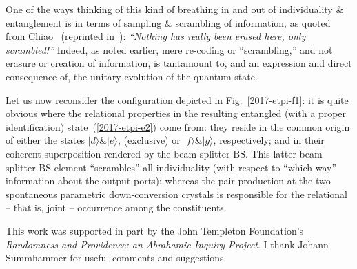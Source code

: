 \documentclass[%
  twocolumn,
 showpacs,
 showkeys,
 preprintnumbers,
 amsmath,amssymb,
 aps,
  pra,
  longbibliography,
 floatfix,
 ]{revtex4-1}
\begin{document}

One of the ways thinking of this kind of  breathing in and out of individuality {\&} entanglement  is in terms of
sampling  {\&} scrambling of information,
as quoted from Chiao~\cite[p.~27]{green-horn-zei} (reprinted in~\cite{Macchiavello-2001}):
{\em ``Nothing has really been erased here, only scrambled!''}
Indeed, as noted earlier, mere re-coding or ``scrambling,''
and not erasure or creation of information, is tantamount to,
and an expression and direct consequence of,
the unitary evolution of the quantum state.


Let us now reconsider the configuration depicted in Fig.~\ref{2017-etpi-f1}: it is quite obvious where the relational properties
in the resulting entangled (with a proper identification)
state~(\ref{2017-etpi-e2}) come from: they reside in the common origin of either the states
$\vert d \rangle${\&}$\vert e \rangle$,
(exclusive) or
$\vert f \rangle${\&}$\vert g \rangle$,
respectively;
and in their coherent superposition rendered by the beam splitter $\text{BS}$.
This latter beam splitter $\text{BS}$ element ``scrambles'' all individuality (with respect to ``which way'' information about the output ports);
whereas the pair production at the two spontaneous parametric down-conversion crystals
is responsible for the relational -- that is, joint --  occurrence among the constituents.




\begin{acknowledgments}
This work was supported in part by  the John Templeton Foundation's {\em  Randomness and Providence: an Abrahamic Inquiry Project}.
I thank Johann Summhammer for useful comments and suggestions.

\end{acknowledgments}


\end{document}
